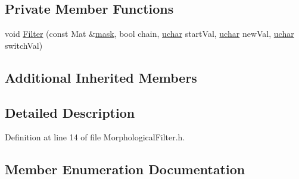 \subsection*{Private Member Functions}
\begin{DoxyCompactItemize}
\item 
void \hyperlink{class_vision_1_1_morphological_filter_ab743062372a8d0b26dabfd27451e72ed}{Filter} (const Mat \&\hyperlink{_gen_blob_8m_a2f6787d513f2bdbca6833c1c1ee04329}{mask}, bool chain, \hyperlink{_soil_math_types_8h_a65f85814a8290f9797005d3b28e7e5fc}{uchar} start\+Val, \hyperlink{_soil_math_types_8h_a65f85814a8290f9797005d3b28e7e5fc}{uchar} new\+Val, \hyperlink{_soil_math_types_8h_a65f85814a8290f9797005d3b28e7e5fc}{uchar} switch\+Val)
\end{DoxyCompactItemize}
\subsection*{Additional Inherited Members}


\subsection{Detailed Description}


Definition at line 14 of file Morphological\+Filter.\+h.



\subsection{Member Enumeration Documentation}
\hypertarget{class_vision_1_1_morphological_filter_a1f19c9cb13f0d68778c77d6fd0370868}{}
